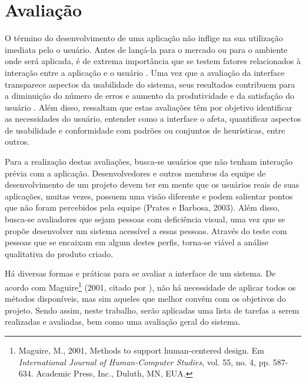 \chapter{\label{chap:avaliacao}Avaliação}

O término do desenvolvimento de uma aplicação não inflige na sua utilização imediata pelo o usuário. Antes de lançá-la para o mercado ou para o ambiente onde será aplicada, é de extrema importância que se testem fatores relacionados à interação entre a aplicação e o usuário \cite{PRATES2003}. Uma vez que a avaliação da interface transparece aspectos da usabilidade do sistema, seus resultados contribuem para a diminuição do número de erros e aumento da produtividade e da satisfação do usuário \cite{WINCKLER2002}. Além disso, \cite{PRATES2003} ressaltam que estas avaliações têm por objetivo identificar as necessidades do usuário, entender como a interface o afeta, quantificar aspectos de usabilidade e conformidade com padrões ou conjuntos de heurísticas, entre outros.

Para a realização destas avaliações, busca-se usuários que não tenham interação prévia com a aplicação. Desenvolvedores e outros membros da equipe de desenvolvimento de um projeto devem ter em mente que os usuários reais de suas aplicações, muitas vezes, possuem uma visão diferente e podem salientar pontos que não foram percebidos pela equipe (Prates e Barbosa, 2003). Além disso, busca-se avaliadores que sejam pessoas com deficiência visual, uma vez que se propõe desenvolver um sistema acessível a essas pessoas. Através do teste com pessoas que se encaixam em algum destes perfis, torna-se viável a análise qualitativa do produto criado.

Há diversas formas e práticas para se avaliar a interface de um sistema. De acordo com Maguire\footnote{Maguire, M., 2001, Methods to support human-centered design. Em \emph{International Journal of Human-Computer Studies}, vol. 55, no. 4, pp. 587-634. Academic Press, Inc., Duluth, MN, EUA.} (2001, citado por \cite{WICH2015}), não há necessidade de aplicar todos os métodos disponíveis, mas sim aqueles que melhor convêm com os objetivos do projeto. Sendo assim, neste trabalho, serão aplicadas uma lista de tarefas a serem realizadas e avaliadas, bem como uma avaliação geral do sistema.

